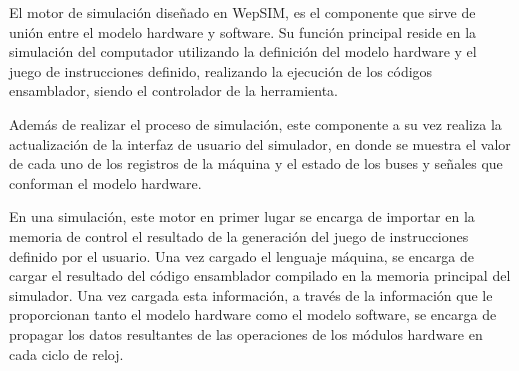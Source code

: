 El motor de simulación diseñado en WepSIM, es el componente que sirve de unión entre el modelo hardware y software. Su función principal reside en la simulación del computador utilizando la definición del modelo hardware  y el juego de instrucciones definido, realizando la ejecución de los códigos ensamblador, siendo el controlador de la herramienta. 

Además de realizar el proceso de simulación, este componente a su vez realiza la actualización de la interfaz de usuario del simulador, en donde se muestra el valor de cada uno de los registros de la máquina y el estado de los buses y señales que conforman el modelo hardware.

En una simulación, este motor en primer lugar se encarga de importar en la memoria de control el resultado de la generación del juego de instrucciones definido por el usuario. Una vez cargado el lenguaje máquina, se encarga de cargar el resultado del código ensamblador compilado en la memoria principal del simulador. Una vez cargada esta información, a través de la información que le proporcionan tanto el modelo hardware como el modelo software, se encarga de propagar los datos resultantes de las operaciones de los módulos hardware en cada ciclo de reloj.

